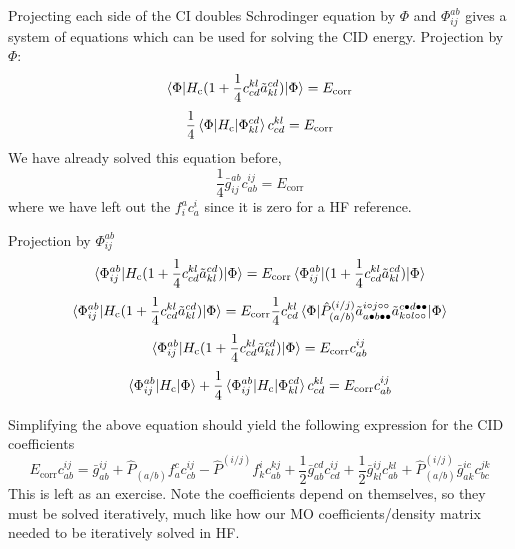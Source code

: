 \documentclass{article}
\newcommand{\h}{\circ}
\newcommand{\p}{\bullet}
\newcommand{\Ecorr}{E_{\mathrm{corr}}}
\newcommand{\Hc}{H_{\mathrm{c}}}
\begin{document}
Projecting each side of the CI doubles Schrodinger equation by $\Phi$ and $\Phi_{ij}^{ab}$ gives a system of equations 
which can be used for solving the CID energy.
Projection by $\Phi$:
\[\braket{\Phi |\Hc (1 + \frac{1}{4} c_{cd}^{kl} \tilde{a}_{kl}^{cd})| \Phi} = \Ecorr \]
\[ \frac{1}{4} \braket{\Phi |\Hc|\Phi_{kl}^{cd}} c_{cd}^{kl} = \Ecorr \]
We have already solved this equation before,
\[ \frac{1}{4} \bar{g}_{ij}^{ab} c_{ab}^{ij} = \Ecorr \]
where we have left out the $f_i^a c_a^i$ since it is zero for a HF reference.

Projection by $\Phi_{ij}^{ab}$
\[\braket{\Phi_{ij}^{ab} |\Hc (1 + \frac{1}{4} c_{cd}^{kl} \tilde{a}_{kl}^{cd})| \Phi} = \Ecorr \braket{\Phi_{ij}^{ab}| (1 + \frac{1}{4} c_{cd}^{kl} \tilde{a}_{kl}^{cd}) | \Phi} \]
\[\braket{\Phi_{ij}^{ab} |\Hc (1 + \frac{1}{4} c_{cd}^{kl} \tilde{a}_{kl}^{cd})| \Phi} 
          =  \Ecorr \frac{1}{4} c_{cd}^{kl} \braket{\Phi| \hat{P}_{(a/b)}^{(i/j)} \tilde{a}_{a \p b \p \p}^{i \h j \h \h}  \tilde{a}_{k \h l \h \h}^{c \p d \p \p} | \Phi} \]
\[\braket{\Phi_{ij}^{ab} |\Hc (1 + \frac{1}{4} c_{cd}^{kl} \tilde{a}_{kl}^{cd})| \Phi} 
          =  \Ecorr c_{ab}^{ij} \]
\[\braket{\Phi_{ij}^{ab} |\Hc | \Phi } + \frac{1}{4} \braket{\Phi_{ij}^{ab}| \Hc | \Phi_{kl}^{cd}} c_{cd}^{kl}
          =  \Ecorr c_{ab}^{ij} \]


Simplifying the above equation should yield the following expression for the
CID coefficients 
\[  \Ecorr c_{ab}^{ij} = \bar{g}_{ab}^{ij} + \hat{P}_{(a/b)} f_a^c c_{cb}^{ij} - \hat{P}^{(i/j)} f_k^i c_{ab}^{kj}
 + \frac{1}{2} \bar{g}_{ab}^{cd} c_{cd}^{ij} + \frac{1}{2} \bar{g}_{kl}^{ij} c_{ab}^{kl} +
  \hat{P}^{(i/j)}_{(a/b)} \bar{g}_{ak}^{ic} c_{bc}^{jk}
\]
This is left as an exercise. 
Note the coefficients depend on themselves, so they must be solved iteratively,
much like how our MO coefficients/density matrix needed to be iteratively solved in HF.
\end{document}
